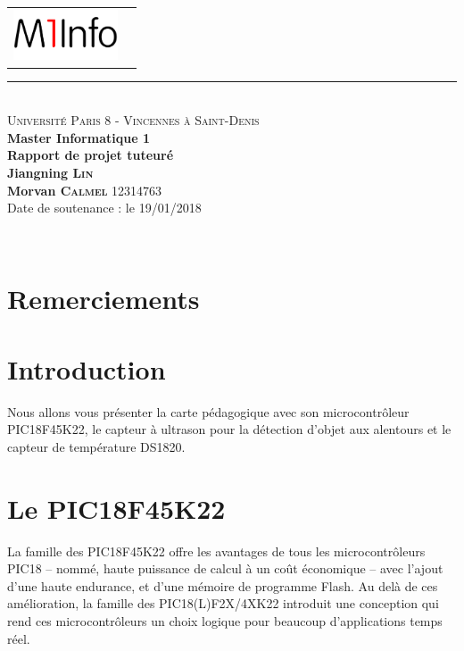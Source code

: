 \documentclass[a4paper, 12pt]{book}
\newcounter{program}[subsection]
\begin{document}
\begin{titlepage}
  \begin{center}
    \begin{tabular*}{\textwidth}{l@{\extracolsep{\fill}}r}
      \includegraphics[height=1.5cm]{images/m1info.png}
    \end{tabular*}
    \small 
    \rule{\textwidth}{.5pt}~\\
    \large 
    \textsc{Université Paris 8 - Vincennes à Saint-Denis}\vspace{0.5cm}\\
    \textbf{Master Informatique 1}\vspace{3.0cm}\\
    \Large
    \textbf{Rapport de projet tuteuré}\vspace{1.5cm}\\
    \large
    \textbf{Jiangning \textsc{Lin}}\\
    \textbf{Morvan \textsc{Calmel}} 12314763\vspace{1.5cm}\\
    Date de soutenance : le 19/01/2018\vspace{1.75cm}\\
  \end{center}\vspace{1.5cm}~\\
\end{titlepage}
\frontmatter
\tableofcontents
\mainmatter

\chapter{Remerciements}

\chapter{Introduction}
Nous allons vous présenter la carte pédagogique avec son microcontrôleur PIC18F45K22, le capteur à ultrason pour la détection d'objet aux alentours et le capteur de température DS1820.
\chapter{Le PIC18F45K22}
La famille des PIC18F45K22 offre les avantages de tous les microcontrôleurs  PIC18 – nommé, haute puissance de calcul à un coût économique – avec l’ajout d’une haute endurance, et d’une mémoire de programme Flash. Au delà de ces amélioration, la famille des PIC18(L)F2X/4XK22 introduit une conception qui rend ces microcontrôleurs un choix logique pour beaucoup d’applications temps réel.\\
\end{document}
